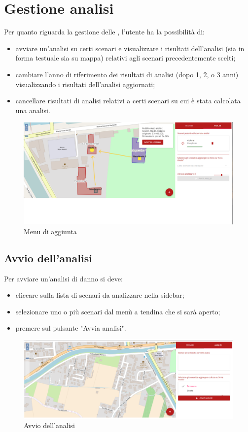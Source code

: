 \section{Gestione analisi}
	Per quanto riguarda la gestione delle , l'utente ha la possibilità di:
	\begin{itemize}
		\item avviare un'analisi su certi scenari e visualizzare i risultati dell'analisi (sia in forma testuale sia su mappa) relativi agli scenari precedentemente scelti;
		\item cambiare l'anno di riferimento dei risultati di analisi (dopo 1, 2, o 3 anni) visualizzando i risultati dell'analisi aggiornati;
		\item cancellare risultati di analisi relativi a certi scenari su cui è stata calcolata una analisi.
	\end{itemize}
	
		\begin{figure}[H]
			\centering
			\includegraphics[width=\textwidth]{img/analisi.png}
			\caption{Menu di aggiunta}
		\end{figure}
		
\subsection{Avvio dell'analisi}
	Per avviare un'analisi di danno si deve:
	\begin{itemize}
		\item cliccare sulla lista di scenari da analizzare nella sidebar;
		\item selezionare uno o più scenari dal menù a tendina che si sarà aperto;
		\item premere sul pulsante "Avvia analisi".
	\end{itemize}

	\begin{figure}[H]
		\centering
		\includegraphics[width=\textwidth]{img/avvio_analisi.png}
		\caption{Avvio dell'analisi}
	\end{figure}

